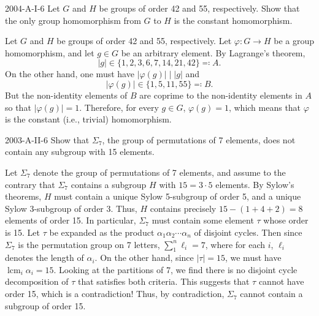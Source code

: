 \documentclass{article}
\begin{document}
	\begin{prb}{2004-A-I-6}
		Let $G$ and $H$ be groups of order 42 and 55, respectively. Show that the only group homomorphism from $G$ to $H$ is the constant homomorphism. 
	\end{prb}
	Let $G$ and $H$ be groups of order 42 and 55, respectively. Let $\varphi:G \to H$ be a group homomorphism, and let $g \in G$ be an arbitrary element. By Lagrange's theorem, 
	\begin{equation*}
		|g| \in \{1, 2, 3, 6, 7, 14, 21, 42\} \eqqcolon A. 
	\end{equation*}
	On the other hand, one must have $|\varphi(g)| \mid |g|$ and 
	\begin{equation*}
		|\varphi(g)| \in \{1, 5, 11, 55\} \eqqcolon B. 
	\end{equation*}
	But the non-identity elements of $B$ are coprime to the non-identity elements in $A$ so that $|\varphi(g)| = 1$. Therefore, for every $g \in G$, $\varphi(g)= 1$, which means that $\varphi$ is the constant (i.e., trivial) homomorphism. 
	
	\begin{prb}{2003-A-II-6}
		Show that $\Sigma_{7}$, the group of permutations of 7 elements, does not contain any subgroup with 15 elements. 
	\end{prb}
	Let $\Sigma_{7}$ denote the group of permutations of 7 elements, and assume to the contrary that $\Sigma_{7}$ contains a subgroup $H$ with $15 = 3 \cdot 5$ elements. By Sylow's theorems, $H$ must contain a unique Sylow 5-subgroup of order 5, and a unique Sylow 3-subgroup of order $3$. Thus, $H$ contains precisely $15 - (1 + 4 + 2) = 8$ elements of order 15. In particular, $\Sigma_{7}$ must contain some element $\tau$ whose order is 15. Let $\tau$ be expanded as the product $\alpha_{1}\alpha_{2}\dotsm \alpha_{n}$ of disjoint cycles. Then since $\Sigma_{7}$ is the permutation group on 7 letters, $\sum_{1}^{n}\ell_{i} = 7$, where for each $i$, $\ell_{i}$ denotes the length of $\alpha_{i}$. On the other hand, since $|\tau| = 15$, we must have $\operatorname{lcm}_{i}{\alpha_{i}} = 15$. Looking at the partitions of 7, we find there is no disjoint cycle decomposition of $\tau$ that satisfies both criteria. This suggests that $\tau$ cannot have order 15, which is a contradiction! Thus, by contradiction, $\Sigma_{7}$ cannot contain a subgroup of order 15. 
	
\end{document}
